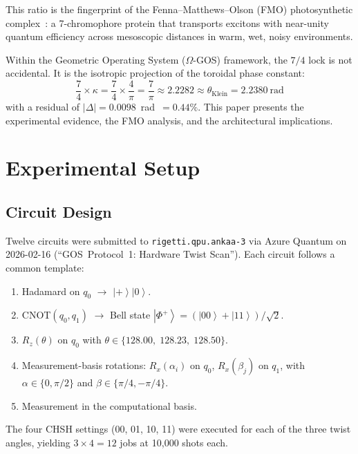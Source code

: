 \documentclass[11pt,twocolumn]{article}
\providecommand{\ket}[1]{\left|#1\right\rangle}
\begin{document}
This ratio is the fingerprint of the Fenna--Matthews--Olson (FMO)
photosynthetic complex~\cite{Adolphs2006,Engel2007}: a 7-chromophore
protein that transports excitons with near-unity quantum efficiency
across mesoscopic distances in warm, wet, noisy environments.

Within the Geometric Operating System (\mbox{$\Omega$-GOS}) framework, the
$7/4$ lock is not accidental.  It is the isotropic projection of the
toroidal phase constant:
\begin{equation}
  \frac{7}{4} \times \kappa = \frac{7}{4} \times \frac{4}{\pi}
  = \frac{7}{\pi} \approx 2.2282 \approx \theta_{\mathrm{Klein}} = 2.2380~\text{rad}
  \label{eq:bridge}
\end{equation}
with a residual of $|\Delta| = 0.0098$~rad~$= 0.44\%$.  This paper
presents the experimental evidence, the FMO analysis, and the
architectural implications.

\section{Experimental Setup}

\subsection{Circuit Design}

Twelve circuits were submitted to \texttt{rigetti.qpu.ankaa-3} via
Azure Quantum on 2026-02-16 (``GOS~Protocol~1: Hardware Twist Scan'').
Each circuit follows a common template:
\begin{enumerate}
  \item Hadamard on $q_0$ $\rightarrow$ $\ket{+}\ket{0}$.
  \item CNOT$(q_0, q_1)$ $\rightarrow$ Bell state
        $\ket{\Phi^+} = (\ket{00}+\ket{11})/\sqrt{2}$.
  \item $R_z(\theta)$ on $q_0$ with $\theta \in
        \{128.00,\; 128.23,\; 128.50\}$\textdegree{}.
  \item Measurement-basis rotations: $R_x(\alpha_i)$ on $q_0$,
        $R_x(\beta_j)$ on $q_1$, with $\alpha \in \{0, \pi/2\}$
        and $\beta \in \{\pi/4, -\pi/4\}$.
  \item Measurement in the computational basis.
\end{enumerate}

The four CHSH settings (00, 01, 10, 11) were executed for each of the
three twist angles, yielding $3 \times 4 = 12$ jobs at 10{,}000 shots
each.
\end{document}
